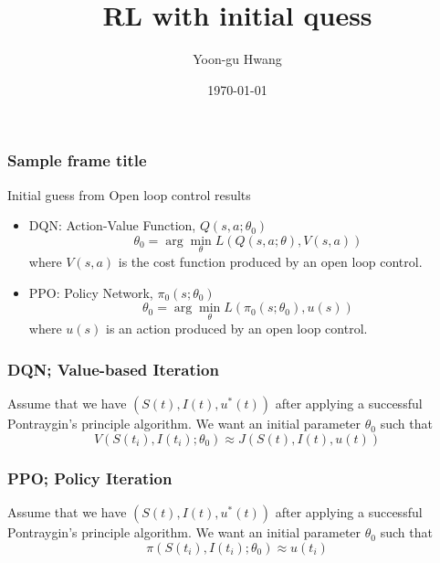 \documentclass{beamer}
\title{RL with initial quess}
\author{Yoon-gu Hwang}
\institute{LG CNS}
\date{\today}
\begin{document}
\begin{frame}
\frametitle{Sample frame title}
Initial guess from Open loop control results
\begin{itemize}
	\item DQN: Action-Value Function, $Q(s,a;\theta_0)$
	\begin{equation}
		\theta_0 = \arg\min_\theta L(Q(s,a;\theta), V(s,a))
	\end{equation}where $V(s,a)$ is the cost function produced by an open loop control.
	\item PPO: Policy Network, $\pi_0(s;\theta_0)$
	\begin{equation}
		\theta_0 = \arg\min_\theta L(\pi_0(s;\theta_0), u(s))
	\end{equation}where $u(s)$ is an action produced by an open loop control.
\end{itemize}
\end{frame}

\begin{frame}\frametitle{DQN; Value-based Iteration}
Assume that we have $(S(t), I(t), u^*(t))$ after applying a successful Pontraygin's principle algorithm.
We want an initial parameter $\theta_0$ such that
\begin{equation}
	V(S(t_i), I(t_i);\theta_0) \approx J(S(t), I(t), u(t))
\end{equation}

\end{frame}

\begin{frame}\frametitle{PPO; Policy Iteration}
Assume that we have $(S(t), I(t), u^*(t))$ after applying a successful Pontraygin's principle algorithm.
We want an initial parameter $\theta_0$ such that
\begin{equation}
	\pi(S(t_i), I(t_i);\theta_0) \approx u(t_i)
\end{equation}

\end{frame}
\end{document}
